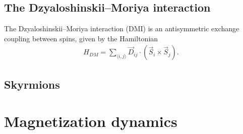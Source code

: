 \documentclass[12pt, a4paper, twoside, openright]{article}		%
\let\oldsection\section
\def\section{\cleardoublepage\oldsection}
\numberwithin{equation}{section}
\begin{document}
\subsection{The Dzyaloshinskii--Moriya interaction}
The Dzyaloshinskii--Moriya interaction (DMI) is an antisymmetric exchange coupling between spins, given by the Hamiltonian
\begin{align}
H_{DM} = \sum_{\langle i,j\rangle}\vec{D}_{ij}\cdot(\vec{S}_i\times\vec{S}_j).
\end{align}

\subsection{Skyrmions}

\section{Magnetization dynamics}
\end{document}
